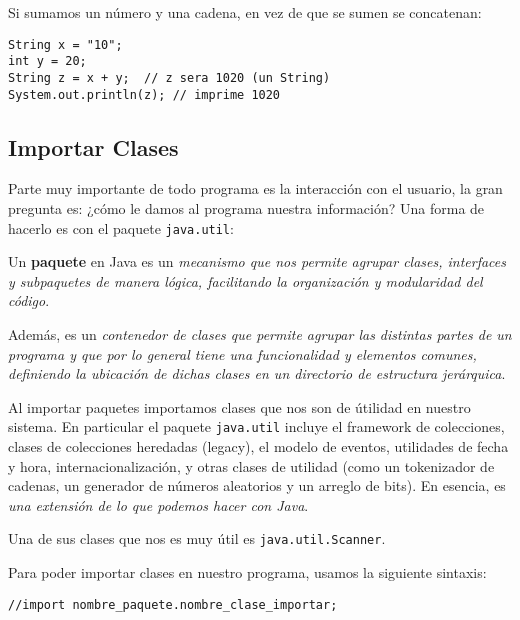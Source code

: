 \documentclass[12pt]{article}
\theoremstyle{largebreak}
\begin{document}
    \begin{obs}
        Si sumamos un número y una cadena, en vez de que se sumen se concatenan:
        \begin{lstlisting}[caption={Suma de Número y \lstinline|String|.},label=DescriptiveLabel]
String x = "10";
int y = 20;
String z = x + y;  // z sera 1020 (un String)
System.out.println(z); // imprime 1020
        \end{lstlisting}
    \end{obs}

    \subsection{Importar Clases}

    Parte muy importante de todo programa es la interacción con el usuario, la gran pregunta es: ¿cómo le damos al programa nuestra información? Una forma de hacerlo es con el paquete \lstinline|java.util|:

    \begin{mydef}
        Un \textbf{paquete} en Java es un \textit{mecanismo que nos permite agrupar clases, interfaces y subpaquetes de manera lógica, facilitando la organización y modularidad del código}.

        Además, es un \textit{contenedor de clases que permite agrupar las distintas partes de un programa y que por lo general tiene una funcionalidad y elementos comunes, definiendo la ubicación de dichas clases en un directorio de estructura jerárquica}.
    \end{mydef}

    Al importar paquetes importamos clases que nos son de útilidad en nuestro sistema. En particular el paquete \lstinline|java.util| incluye el framework de colecciones, clases de colecciones heredadas (legacy), el modelo de eventos, utilidades de fecha y hora, internacionalización, y otras clases de utilidad (como un tokenizador de cadenas, un generador de números aleatorios y un arreglo de bits). En esencia, es \textit{una extensión de lo que podemos hacer con Java}.

    Una de sus clases que nos es muy útil es \lstinline|java.util.Scanner|.

    Para poder importar clases en nuestro programa, usamos la siguiente sintaxis:

    \begin{lstlisting}[caption={Importar Clases en Java.},label=DescriptiveLabel]
//import nombre_paquete.nombre_clase_importar;
    \end{lstlisting}
\end{document}
